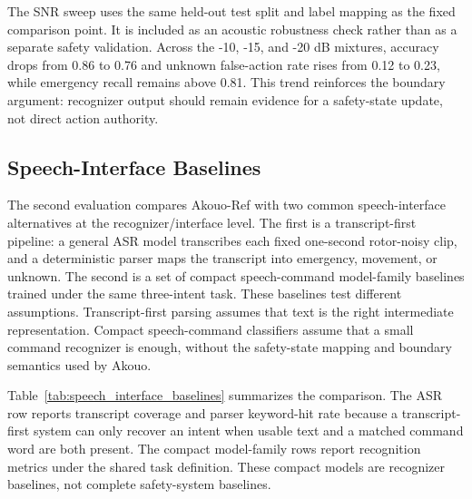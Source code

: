 The SNR sweep uses the same held-out test split and label mapping as the fixed comparison point. It is included as an acoustic robustness check rather than as a separate safety validation. Across the -10, -15, and -20 dB mixtures, accuracy drops from 0.86 to 0.76 and unknown false-action rate rises from 0.12 to 0.23, while emergency recall remains above 0.81. This trend reinforces the boundary argument: recognizer output should remain evidence for a safety-state update, not direct action authority.

\subsection{Speech-Interface Baselines}

The second evaluation compares Akouo-Ref with two common speech-interface alternatives at the recognizer/interface level. The first is a transcript-first pipeline: a general ASR model transcribes each fixed one-second rotor-noisy clip, and a deterministic parser maps the transcript into emergency, movement, or unknown. The second is a set of compact speech-command model-family baselines trained under the same three-intent task. These baselines test different assumptions. Transcript-first parsing assumes that text is the right intermediate representation. Compact speech-command classifiers assume that a small command recognizer is enough, without the safety-state mapping and boundary semantics used by Akouo.

Table~\ref{tab:speech_interface_baselines} summarizes the comparison. The ASR row reports transcript coverage and parser keyword-hit rate because a transcript-first system can only recover an intent when usable text and a matched command word are both present. The compact model-family rows report recognition metrics under the shared task definition. These compact models are recognizer baselines, not complete safety-system baselines.

